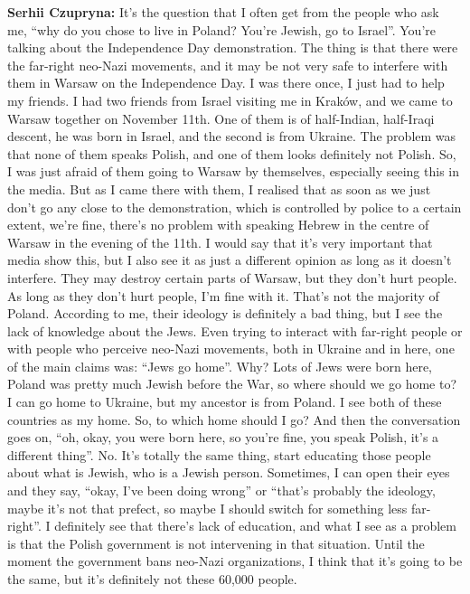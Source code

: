 \textbf{Serhii Czupryna:} It’s the question that I often get from the people who ask me, ``why do you chose to live in Poland? You’re Jewish, go to Israel''. You’re talking about the Independence Day demonstration. The thing is that there were the far-right neo-Nazi movements, and it may be not very safe to interfere with them in Warsaw on the Independence Day. I was there once, I just had to help my friends. I had two friends from Israel visiting me in Kraków, and we came to Warsaw together on  November 11th. One of them is of half-Indian, half-Iraqi descent, he was born in Israel, and the second is from Ukraine. The problem was that none of them speaks Polish, and one of them looks definitely not Polish. So, I was just afraid of them going to Warsaw by themselves, especially seeing this in the media. But as I came there with them, I realised that as soon as we just don’t go any close to the demonstration, which is controlled by police to a certain extent, we’re fine, there’s no problem with speaking Hebrew in the centre of Warsaw in the evening of the 11th. I would say that it’s very important that media show this, but I also see it as just a different opinion as long as it doesn’t interfere. They may destroy certain parts of Warsaw, but they don’t hurt people. As long as they don’t hurt people, I’m fine with it. That’s not the majority of Poland. According to me, their ideology is definitely a bad thing, but I see the lack of knowledge about the Jews. Even trying to interact with far-right people or with people who perceive neo-Nazi movements, both in Ukraine and in here, one of the main claims was: ``Jews go home''. Why? Lots of Jews were born here, Poland was pretty much Jewish before the War, so where should we go home to? I can go home to Ukraine, but my ancestor is from Poland. I see both of these countries as my home. So, to which home should I go? And then the conversation goes on, ``oh, okay, you were born here, so you’re fine, you speak Polish, it’s a different thing''. No. It’s totally the same thing, start educating those people about what is Jewish, who is a Jewish person. Sometimes, I can open their eyes and they say, ``okay, I’ve been doing wrong'' or ``that’s probably the ideology, maybe it’s not that prefect, so maybe I should switch for something less far-right''. I definitely see that there’s lack of education, and what I see as a problem is that the Polish government is not intervening in that situation. Until the moment the government bans neo-Nazi organizations, I think that it’s going to be the same, but it’s definitely not these 60,000 people.\par
